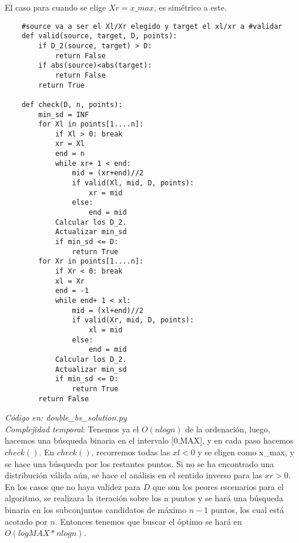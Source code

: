 \documentclass{article}
\begin{document}
El caso para cuando se elige $Xr= x\_max$, es sim\'etrico a este. \\

\begin{verbatim}
    #source va a ser el Xl/Xr elegido y target el xl/xr a #validar 
    def valid(source, target, D, points):
        if D_2(source, target) > D:
            return False
        if abs(source)<abs(target):
            return False
        return True
    
    def check(D, n, points):
        min_sd = INF
        for Xl in points[1....n]:
            if Xl > 0: break
            xr = Xl
            end = n
            while xr+ 1 < end:
                mid = (xr+end)//2
                if valid(Xl, mid, D, points):
                    xr = mid
                else:
                    end = mid
            Calcular los D_2.
            Actualizar min_sd
            if min_sd <= D:
                return True
        for Xr in points[1....n]:
            if Xr < 0: break
            xl = Xr
            end = -1
            while end+ 1 < xl:
                mid = (xl+end)//2
                if valid(Xr, mid, D, points):
                    xl = mid
                else:
                    end = mid
            Calcular los D_2.
            Actualizar min_sd
            if min_sd <= D:
                return True
        return False
\end{verbatim}
\textit{C\'odigo en: double\_bs\_solution.py}\\

\textit{Complejidad temporal}: Tenemos ya el $O(nlogn)$ de la ordenaci\'on, luego, hacemos una b\'usqueda binaria en el intervalo [0,MAX], y en cada paso hacemos $check()$. En $check()$, recorremos todas las $xl<0$ y se eligen como x\_max, y se hace una b\'usqueda por los restantes puntos. Si no se ha encontrado una distribuci\'on v\'alida a\'un, se hace el an\'alisis en el sentido inverso para las $xr>0$. En los casos que no haya validez para $D$ que son los peores escenarios para el algoritmo, se realizara la iteraci\'on sobre los n puntos y se har\'a una b\'usqueda binaria en los subconjuntos candidatos de m\'aximo $n-1$ puntos, los cual est\'a acotado por $n$. Entonces tenemos que buscar el \'optimo se har\'a en $O(logMAX*nlogn)$.\\
\end{document}
